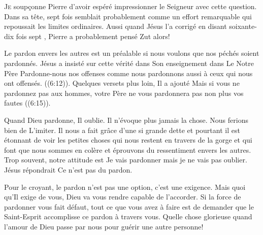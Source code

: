 



\lettrine{J}{e} soup\c{c}onne Pierre d'avoir espéré impressionner le Seigneur
 avec cette question. Dans sa tête, \Og sept fois \Fg{} semblait probablement
 comme un effort remarquable qui repoussait les limites ordinaires.
 Aussi quand Jésus l'a corrigé en disant \Og soixante-dix fois sept \Fg{},
 Pierre a probablement pensé\frcolon{} \Og Zut alors! \Fg{}

Le pardon envers les autres est un préalable si nous voulons
 que nos péchés soient pardonnés. Jésus a insisté sur cette vérité
 dans Son enseignement dans \Og Le Notre Père \Fg{}\frcolon{} 
 \Og Pardonne-nous nos offenses comme nous pardonnons aussi
 à ceux qui nous ont offensés. \Fg{} ((6:12)).
 Quelques versets plus loin, Il a ajouté\frcolon{} 
 \Og Mais si vous ne pardonnez pas aux hommes,
 votre Père ne vous pardonnera pas non plus vos fautes \Fg{} 
 ((6:15)). 


Quand Dieu pardonne, Il oublie. Il n'évoque plus jamais la chose.
 Nous ferions bien de L'imiter. Il nous a fait grâce d'une si grande dette
 et pourtant il est étonnant de voir les petites choses
 qui nous restent en travers de la gorge et qui font que nous sommes en colère
 et éprouvons du ressentiment envers les autres.
 Trop souvent, notre attitude est\frcolon{} 
 \Og Je vais pardonner \ocadr mais je ne vais pas oublier. \Fg{}
 Jésus répondrait\frcolon{} \Og Ce n'est pas du pardon. \Fg{}

Pour le croyant, le pardon n'est pas une option, c'est une exigence.
 Mais quoi qu'Il  exige de vous, Dieu va vous rendre
 capable de l'accorder. Si la force de pardonner vous fait défaut,
 tout ce que vous avez à faire est de demander que le Saint-Esprit
 accomplisse ce pardon à travers vous.
 Quelle chose glorieuse quand l'amour de Dieu passe par nous pour guérir
 une autre personne!

